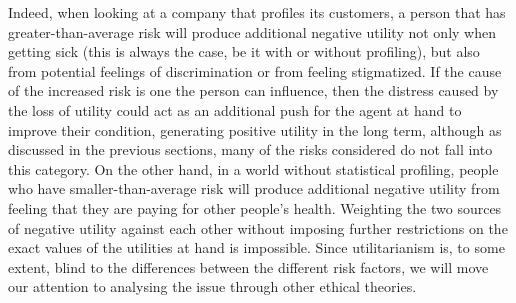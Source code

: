 Indeed, when looking at a company that profiles its customers, a person that has greater-than-average risk will produce additional negative utility not only when getting sick (this is always the case, be it with or without profiling), but also from potential feelings of discrimination or from feeling stigmatized. If the cause of the increased risk is one the person can influence, then the distress caused by the loss of utility could act as an additional push for the agent at hand to improve their condition, generating positive utility in the long term, although as discussed in the previous sections, many of the risks considered do not fall into this category. On the other hand, in a world without statistical profiling, people who have smaller-than-average risk will produce additional negative utility from feeling that they are paying for other people's health. Weighting the two sources of negative utility against each other without imposing further restrictions on the exact values of the utilities at hand is impossible. Since utilitarianism is, to some extent, blind to the differences between the different risk factors, we will move our attention to analysing the issue through other ethical theories.

